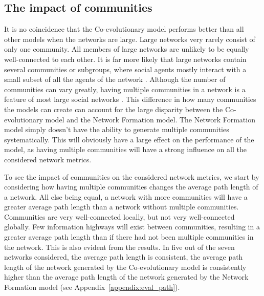 \documentclass[11pt]{article}
\begin{document}
\subsection{The impact of communities}
It is no coincidence that the Co-evolutionary model performs better than all other models when the networks are large. Large networks very rarely consist of only one community. All members of large networks are unlikely to be equally well-connected to each other. It is far more likely that large networks contain several communities or subgroups, where social agents mostly interact with a small subset of all the agents of the network \cite{backstrom2006group}. 
Although the number of communities can vary greatly, having multiple communities in a network is a feature of most large social networks \cite{backstrom2006group, yang2011detecting}.
This difference in how many communities the models can create can account for the large disparity between the Co-evolutionary model and the Network Formation model. 
The Network Formation model simply doesn't have the ability to generate multiple communities systematically. This will obviously have a large effect on the performance of the model, as having multiple communities will have a strong influence on all the considered network metrics. 

To see the impact of communities on the considered network metrics, we start by considering how having multiple communities changes the average path length of a network. 
All else being equal, a network with more communities will have a greater average path length than a network without multiple communities. 
Communities are very well-connected locally, but not very well-connected globally. 
Few information highways will exist between communities, resulting in a greater average path length than if there had not been multiple communities in the network. 
This is also evident from the results. In five out of the seven networks considered, the average path length is consistent, the average path length of the network generated by the Co-evolutionary model is consistently higher than the average path length of the network generated by the Network Formation model (see Appendix~\ref{appendix:eval_path}).
\end{document}
